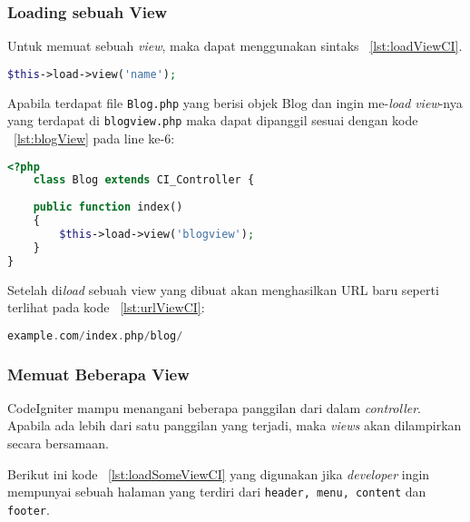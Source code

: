 \subsubsection{Loading sebuah View}
\label{ss:loadViewCI}
Untuk memuat sebuah \textit{view}, maka dapat menggunakan sintaks  ~\ref{lst:loadViewCI}.

\begin{lstlisting}[style=customphp, language=PHP, basicstyle=\ttfamily, frame=single, columns=fullflexible, keepspaces=true, breaklines=true, showstringspaces=false, label={lst:loadViewCI}, caption=Sintaks load view pada CodeIgniter.] 
$this->load->view('name');
\end{lstlisting}

Apabila terdapat file \texttt{Blog.php} yang berisi objek Blog  dan ingin me-\textit{load} \textit{view}-nya yang terdapat di \texttt{blogview.php} maka dapat dipanggil sesuai dengan kode ~\ref{lst:blogView} pada line ke-6:
\begin{lstlisting}[style=customphp, language=PHP, basicstyle=\ttfamily, frame=single, columns=fullflexible, keepspaces=true, breaklines=true, showstringspaces=false, label={lst:blogView}, caption=Contoh load view pada CodeIgniter.] 
<?php
	class Blog extends CI_Controller {
	
	public function index()
	{
		$this->load->view('blogview');
	}
}
\end{lstlisting}

\noindent Setelah di\textit{load} sebuah view yang dibuat akan menghasilkan URL baru seperti terlihat pada kode ~\ref{lst:urlViewCI}:
\begin{lstlisting}[style=customphp, language=PHP, basicstyle=\ttfamily, frame=single, columns=fullflexible, keepspaces=true, breaklines=true, showstringspaces=false, label={lst:urlViewCI}, caption=Contoh load view pada CodeIgniter.] 
example.com/index.php/blog/
\end{lstlisting}

\subsubsection{Memuat Beberapa View}
\label{ss:beberapaViewCI}
CodeIgniter mampu menangani beberapa panggilan dari dalam \textit{controller}. Apabila ada lebih dari satu panggilan yang terjadi, maka \textit{views} akan dilampirkan secara bersamaan.



\noindent Berikut ini kode ~\ref{lst:loadSomeViewCI} yang digunakan jika \textit{developer} ingin mempunyai sebuah halaman yang terdiri dari \texttt{header, menu, content} dan \texttt{footer}. 


